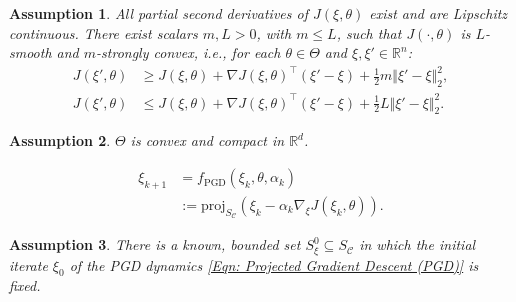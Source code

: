 \documentclass[10pt,a4paper]{amsart}
\newtheorem{assumption}{Assumption}
\newcommand{\R}{\mathbb{R}}
\newcommand{\antoine}[1]{{\textcolor[rgb]{1,0,0}{\textsf{[Antoine: {#1}]}}}}
\newcommand{\constraintSet}{{S_{\mathcal{C}}}}
\newcommand{\diam}{\text{diam}}
\newcommand{\dynamicsPGD}{f_{\text{PGD}}}
\newcommand{\frank}[1]{{\textcolor[rgb]{0,0,1}{\textsf{[Frank: {#1}]}}}}
\newcommand{\obj}{J}
\newcommand{\param}{\theta}
\newcommand{\paramDim}{d}
\newcommand{\paramSet}{\Theta}
\newcommand{\proj}{\text{proj}}
\newcommand{\ratePGD}{\alpha}
\newcommand{\ratePGDMax}{C_\ratePGD}
\newcommand{\ratePGDMin}{c_\ratePGD}
\newcommand{\smoothnessConstant}{L}
\newcommand{\strongConvexityConstant}{m}
\newcommand{\var}{\xi}
\newcommand{\varDim}{n}
\newcommand{\varInitialSet}{S_\var^0}
\begin{document}
\begin{assumption}
\label{Assump: Objective Properties}
All partial second derivatives of $\obj(\var, \param)$ exist and are Lipschitz continuous. 
There exist scalars
$\strongConvexityConstant, \smoothnessConstant > 0$, with $\strongConvexityConstant \leq \smoothnessConstant$, such that $\obj(\cdot, \param)$ is $\smoothnessConstant$-smooth and $\strongConvexityConstant$-strongly convex, 
i.e., for each $\param \in \paramSet$ 
and $\var, \var' \in \R^\varDim$:
\begin{align} \nonumber
    \obj(\var', \param) &\geq \obj(\var, \param) + \nabla \obj(\var, \param)^\top (\var' - \var) + \textstyle\frac{1}{2}\strongConvexityConstant \Vert \var' - \var \Vert_2^2, \\ \nonumber
    \obj(\var', \param) &\leq \obj(\var, \param) + \nabla \obj(\var, \param)^\top (\var' - \var) + \textstyle\frac{1}{2}\smoothnessConstant \Vert \var' - \var \Vert_2^2.
\end{align}
\end{assumption}

\begin{assumption}
\label{Assump: Parameter Set is Convex and Compact}
$\paramSet$ is convex and compact in $\R^\paramDim$. 
\end{assumption}

\begin{align} 
\label{Eqn: PGD Updates Notation}
    \var_{k+1} &= \dynamicsPGD(\var_k, \param, \ratePGD_k) \\ \label{Eqn: Projected Gradient Descent (PGD)}
    &:= \proj_\constraintSet\left( \var_k - \ratePGD_k \nabla_\var \obj(\var_k, \param) \right).
\end{align}

\begin{assumption}
\label{Assump: PGD Dynamics, Initial Iterate}
There is a known, bounded set $\varInitialSet \subseteq \constraintSet$ in which the initial iterate $\var_0$ of the PGD dynamics \eqref{Eqn: Projected Gradient Descent (PGD)} is fixed.
\end{assumption}
\end{document}
